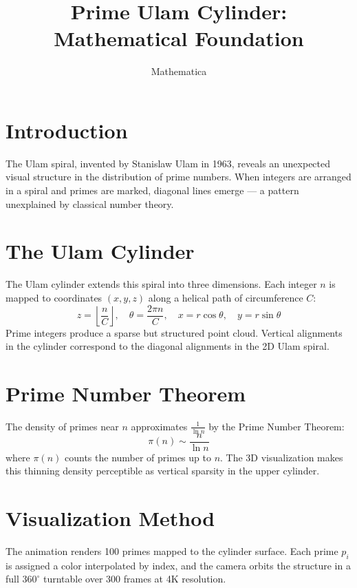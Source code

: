 \documentclass{article}
\title{Prime Ulam Cylinder: Mathematical Foundation}
\author{Mathematica}
\begin{document}
\maketitle

\section{Introduction}

The Ulam spiral, invented by Stanislaw Ulam in 1963, reveals an
unexpected visual structure in the distribution of prime numbers. When
integers are arranged in a spiral and primes are marked, diagonal lines
emerge --- a pattern unexplained by classical number theory.

\section{The Ulam Cylinder}

The Ulam cylinder extends this spiral into three dimensions. Each
integer $n$ is mapped to coordinates $(x, y, z)$ along a helical path
of circumference $C$:
\[
  z = \left\lfloor \frac{n}{C} \right\rfloor, \quad
  \theta = \frac{2\pi n}{C}, \quad
  x = r\cos\theta, \quad y = r\sin\theta
\]
Prime integers produce a sparse but structured point cloud. Vertical
alignments in the cylinder correspond to the diagonal alignments in the
2D Ulam spiral.

\section{Prime Number Theorem}

The density of primes near $n$ approximates $\frac{1}{\ln n}$ by the
Prime Number Theorem:
\[
  \pi(n) \sim \frac{n}{\ln n}
\]
where $\pi(n)$ counts the number of primes up to $n$. The 3D
visualization makes this thinning density perceptible as vertical
sparsity in the upper cylinder.

\section{Visualization Method}

The animation renders 100 primes mapped to the cylinder surface.
Each prime $p_i$ is assigned a color interpolated by index, and the
camera orbits the structure in a full $360^\circ$ turntable over 300
frames at 4K resolution.
\end{document}
